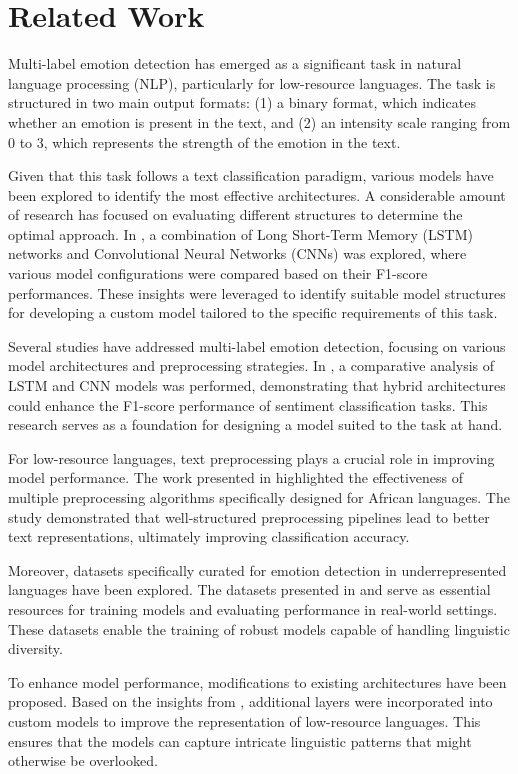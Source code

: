 \section{Related Work}
Multi-label emotion detection has emerged as a significant task in natural language processing (NLP), particularly for low-resource languages. The task is structured in two main output formats: (1) a binary format, which indicates whether an emotion is present in the text, and (2) an intensity scale ranging from 0 to 3, which represents the strength of the emotion in the text.

Given that this task follows a text classification paradigm, various models have been explored to identify the most effective architectures. A considerable amount of research has focused on evaluating different structures to determine the optimal approach. In \cite{wang2016dimensional}, a combination of Long Short-Term Memory (LSTM) networks and Convolutional Neural Networks (CNNs) was explored, where various model configurations were compared based on their F1-score performances. These insights were leveraged to identify suitable model structures for developing a custom model tailored to the specific requirements of this task.

Several studies have addressed multi-label emotion detection, focusing on various model architectures and preprocessing strategies. In \cite{wang2016dimensional}, a comparative analysis of LSTM and CNN models was performed, demonstrating that hybrid architectures could enhance the F1-score performance of sentiment classification tasks. This research serves as a foundation for designing a model suited to the task at hand.

For low-resource languages, text preprocessing plays a crucial role in improving model performance. The work presented in \cite{muhammad2023semeval} highlighted the effectiveness of multiple preprocessing algorithms specifically designed for African languages. The study demonstrated that well-structured preprocessing pipelines lead to better text representations, ultimately improving classification accuracy.

Moreover, datasets specifically curated for emotion detection in underrepresented languages have been explored. The datasets presented in \cite{muhammad2025brighterbridginggaphumanannotated} and \cite{belay-etal-2025-evaluatin} serve as essential resources for training models and evaluating performance in real-world settings. These datasets enable the training of robust models capable of handling linguistic diversity.

To enhance model performance, modifications to existing architectures have been proposed. Based on the insights from \cite{wang2016dimensional}, additional layers were incorporated into custom models to improve the representation of low-resource languages. This ensures that the models can capture intricate linguistic patterns that might otherwise be overlooked.